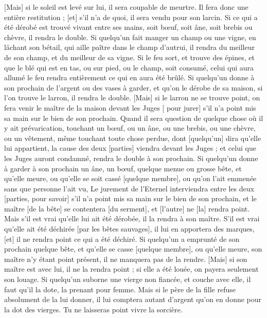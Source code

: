 \begin{multicols}{2}
[Mais] si le soleil est levé sur lui, il sera coupable de meurtre. Il fera donc une entière restitution ; [et] s'il n'a de quoi, il sera vendu pour son larcin.
Si ce qui a été dérobé est trouvé vivant entre ses mains, soit bœuf, soit âne, soit brebis ou chèvre, il rendra le double.
Si quelqu'un fait manger un champ ou une vigne, en lâchant son bétail, qui aille paître dans le champ d'autrui, il rendra du meilleur de son champ, et du meilleur de sa vigne.
Si le feu sort, et trouve des épines, et que le blé qui est en tas, ou sur pied, ou le champ, soit consumé, celui qui aura allumé le feu rendra entièrement ce qui en aura été brûlé.
Si quelqu'un donne à son prochain de l'argent ou des vases à garder, et qu'on le dérobe de sa maison, si l'on trouve le larron, il rendra le double.
[Mais] si le larron ne se trouve point, on fera venir le maître de la maison devant les Juges [ pour jurer] s'il n'a point mis sa main sur le bien de son prochain.
Quand il sera question de quelque chose où il y ait prévarication, touchant un bœuf, ou un âne, ou une brebis, ou une chèvre, ou un vêtement, même touchant toute chose perdue, dont [quelqu'un] dira qu'elle lui appartient, la cause des deux [parties] viendra devant les Juges ; et celui que les Juges auront condamné, rendra le double à son prochain.
Si quelqu'un donne à garder à son prochain un âne, un bœuf, quelque menue ou grosse bête, et qu'elle meure, ou qu'elle se soit cassé [quelque membre], ou qu'on l'ait emmenée sans que personne l'ait vu,
Le jurement de l'Eternel interviendra entre les deux [parties, pour savoir] s'il n'a point mis sa main sur le bien de son prochain, et le maître [de la bête] se contentera [du serment], et [l'autre] ne [la] rendra point.
Mais s'il est vrai qu'elle lui ait été dérobée, il la rendra à son maître.
S'il est vrai qu'elle ait été déchirée [par les bêtes sauvages], il lui en apportera des marques, [et] il ne rendra point ce qui a été déchiré.
Si quelqu'un a emprunté de son prochain quelque bête, et qu'elle se casse [quelque membre], ou qu'elle meure, son maître n'y étant point présent, il ne manquera pas de la rendre.
[Mais] si son maître est avec lui, il ne la rendra point ; si elle a été louée, on payera seulement son louage.
Si quelqu'un suborne une vierge non fiancée, et couche avec elle, il faut qu'il la dote, la prenant pour femme.
Mais si le père de la fille refuse absolument de la lui donner, il lui comptera autant d'argent qu'on en donne pour la dot des vierges.
Tu ne laisseras point vivre la sorcière.

\end{multicols}
